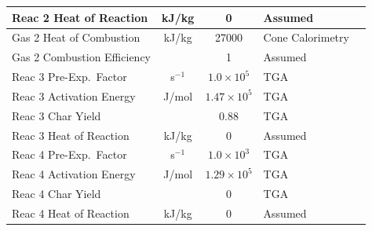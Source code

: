 \begin{table}[p]
\begin{center}
\begin{tabular}{|l|c|c|l|l|}
Reac 2 Heat of Reaction     & kJ/kg         & 0                                 & Assumed                   &  \cite{Oztekin:CF2012}                  \\ \hline
Gas 2 Heat of Combustion    & kJ/kg         & 27000                             & Cone Calorimetry          &  \cite{Oztekin:CF2012}                  \\ \hline
Gas 2 Combustion Efficiency &               & 1                                 & Assumed                   &  \cite{Oztekin:CF2012}                  \\ \hline
Reac 3 Pre-Exp.~Factor      & s$^{-1}$      & $1.0 \times 10^5$                 & TGA                       &  \cite{Oztekin:CF2012}                  \\ \hline
Reac 3 Activation Energy    & J/mol       & $1.47 \times 10^5$                & TGA                       &  \cite{Oztekin:CF2012}                  \\ \hline
Reac 3 Char Yield           &               & 0.88                              & TGA                       &  \cite{Oztekin:CF2012}                  \\ \hline
Reac 3 Heat of Reaction     & kJ/kg         & 0                                 & Assumed                   &  \cite{Oztekin:CF2012}                  \\ \hline
Reac 4 Pre-Exp.~Factor      & s$^{-1}$      & $1.0 \times 10^3$                 & TGA                       &  \cite{Oztekin:CF2012}                  \\ \hline
Reac 4 Activation Energy    & J/mol       & $1.29 \times 10^5$                & TGA                       &  \cite{Oztekin:CF2012}                  \\ \hline
Reac 4 Char Yield           &               & 0                                 & TGA                       &  \cite{Oztekin:CF2012}                  \\ \hline
Reac 4 Heat of Reaction     & kJ/kg         & 0                                 & Assumed                   &  \cite{Oztekin:CF2012}                  \\ \hline
\end{tabular}
\end{center}
\label{Properties_PEEK}
\end{table}

